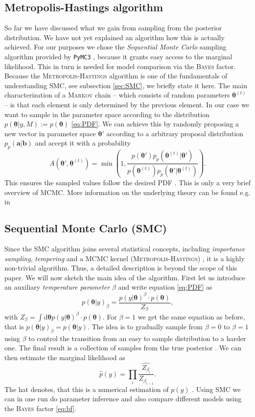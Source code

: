 \documentclass[%
 reprint,
 amsmath,amssymb,
 aps,
]{revtex4-1}
\newcommand{\btheta}{\boldsymbol{\theta}}
\begin{document}
\subsection{Metropolis-Hastings algorithm}
\noindent So far we have discussed what we gain from sampling from the posterior distribution. We have not yet explained an algorithm how this is actually achieved.  For our purposes we chose the \emph{Sequential Monte Carlo} sampling algorithm provided by \texttt{PyMC3} \cite{PyMC3_SMC}, because it grants easy access to the marginal likelihood. This in turn is needed for model comparison via the \textsc{Bayes} factor. Because the \textsc{Metropolis-Hastings} algorithm is one of the fundamentals of understanding SMC, see subsection \eqref{sec:SMC}, we briefly state it here. The main characterization of a \textsc{Markov} chain -- which consists of random parameters $\boldsymbol{\theta}^{(t)}$ -- is that each element is only determined by the previous element. In our case we want to sample in the parameter space according to the distribution $p(\btheta|y,M):=p(\btheta)$ \eqref{eq:PDF}. We can achieve this by randomly proposing a new vector in parameter space $\btheta'$  according to a arbitrary proposal distribution $p_p(\boldsymbol{a}|\boldsymbol{b})$ and accept it with a probability $$A(\btheta',\btheta^{(t)})=\min\left(1,\frac{p(\btheta')p_p(\btheta^{(t)}|\btheta')}{p(\btheta^{(t)})p_p(\btheta'|\btheta^{(t)})}\right).$$
This ensures the sampled values follow the desired PDF \cite{Toussaint}. This is only a very brief overview of MCMC. More information on the underlying theory can be found e.g. in \cite{neal}

\subsection{Sequential Monte Carlo (SMC)}\label{sec:SMC}
 \noindent Since the SMC algorithm joins several statistical concepts, including \emph{importance sampling}, \emph{tempering} and a MCMC kernel (\textsc{Metropolis-Hastings}) \cite{PyMC3_SMC}, it is a highly non-trivial algorithm. Thus, a detailed description is beyond the scope of this paper. We will now sketch the main idea of the algorithm. 
 First let us introduce an auxiliary \emph{temperature parameter} $\beta$ and write equation \eqref{eq:PDF} as 
   $$p(\btheta|y)_\beta=\frac{p(y|\btheta)^\beta\cdot p(\btheta)}{Z_\beta},$$
   with $Z_\beta=\int\text{d}\btheta p(y|\btheta)^\beta\cdot p(\btheta)$. For $\beta=1$ we get the same equation as before, that is $p(\btheta|y)_\beta=p(\btheta|y)$. The idea is to gradually sample from $\beta=0$ to $\beta=1$ using $\beta$ to control the transition from an easy to sample distribution to a harder one. The final result is a collection of samples from the true posterior \cite{PyMC3_SMC}. We can then estimate the marginal likelihood as \cite{SMC_PEPE} \begin{equation}\label{eq:with_the_hat}
   	\hat{p}(y)=\prod_{i}\widehat{\frac{Z_{\beta_i}}{Z_{\beta_{i-1}}}}.
   \end{equation}
     The hat denotes, that this is a numerical estimation of $p(y)$ \cite{SMC_PEPE}. Using SMC we can in one run do parameter inference and also compare different models using the \textsc{Bayes} factor \eqref{eq:bf}.
 
\end{document}
